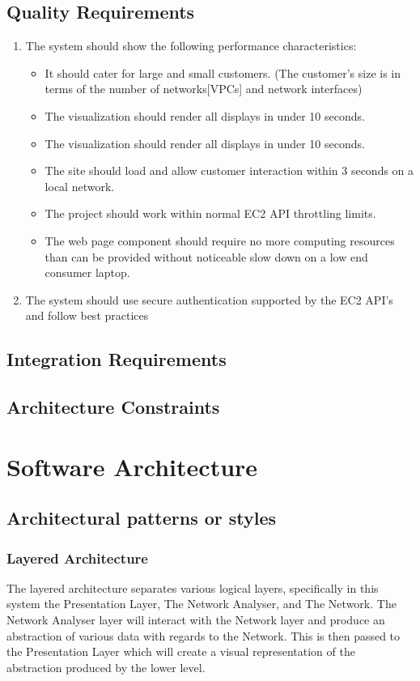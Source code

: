 \documentclass[a4paper,12pt]{report}
\begin{document}
	\subsection{Quality Requirements}
	\begin{enumerate}
		\item The system should show the following performance characteristics:
		\begin{itemize}
			\item It should cater for large and small customers. (The customer's size is in terms of the number of networks[VPCs] and network interfaces)
			\item The visualization should render all displays in under 10 seconds.
			\item The visualization should render all displays in under 10 seconds.
			\item The site should load and allow customer interaction within 3 seconds on a local network.
			\item The project should work within normal EC2 API throttling limits.
			\item The web page component should require no more computing resources than can be provided without noticeable slow down on a low end consumer laptop.
		\end{itemize}
		\item The system should use secure authentication supported by the EC2 API's and follow best practices 
	\end{enumerate}
	\subsection{Integration Requirements}
	\subsection{Architecture Constraints}
\section{Software Architecture}
	\subsection{Architectural patterns or styles}
		\subsubsection{Layered Architecture}
		The layered architecture separates various logical layers, specifically in this system the Presentation Layer, The Network Analyser, and The Network. The Network Analyser layer will interact with the Network layer and produce an abstraction of various data with regards to the Network. This is then passed to the Presentation Layer which will create a visual representation of the abstraction produced by the lower level.
		
\end{document}
